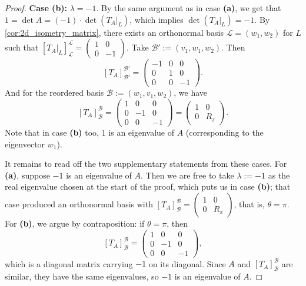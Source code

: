 \begin{proof}
\textbf{Case (b):} $\lambda = -1$. By the same argument as in case \textbf{(a)}, we get that $1 = \det A = (-1) \cdot \det(T_A|_L)$, which implies $\det(T_A|_L) = -1$. By \cref{cor:2d_isometry_matrix}, there exists an orthonormal basis $\mathcal{L} = (w_1, w_2)$ for $L$ such that $[T_A|_L]_{\mathcal{L}}^{\mathcal{L}} = \left(\begin{smallmatrix} 1 & 0 \\ 0 & -1 \end{smallmatrix}\right)$.
Take $\mathcal{B}' := (v_1, w_1, w_2)$. Then
\[ [T_A]_{\mathcal{B}'}^{\mathcal{B}'} = \begin{pmatrix} -1 & 0 & 0 \\ 0 & 1 & 0 \\ 0 & 0 & -1 \end{pmatrix}. \]
And for the reordered basis $\mathcal{B} := (w_1, v_1, w_2)$, we have 
\[ [T_A]_{\mathcal{B}}^{\mathcal{B}} = \begin{pmatrix} 1 & 0 & 0 \\ 0 & -1 & 0 \\ 0 & 0 & -1 \end{pmatrix} = \begin{pmatrix} 1 & 0 \\ 0 & R_\pi \end{pmatrix}. \]
Note that in case \textbf{(b)} too, $1$ is an eigenvalue of $A$ (corresponding to the eigenvector $w_1$).

It remains to read off the two supplementary statements from these cases. For \textbf{(a)}, suppose $-1$ is an eigenvalue of $A$. Then we are free to take $\lambda := -1$ as the real eigenvalue chosen at the start of the proof, which puts us in case \textbf{(b)}; that case produced an orthonormal basis with $[T_A]_{\mathcal{B}}^{\mathcal{B}} = \left(\begin{smallmatrix} 1 & 0 \\ 0 & R_\pi \end{smallmatrix}\right)$, that is, $\theta = \pi$. For \textbf{(b)}, we argue by contraposition: if $\theta = \pi$, then
\[ [T_A]_{\mathcal{B}}^{\mathcal{B}} = \begin{pmatrix} 1 & 0 & 0 \\ 0 & -1 & 0 \\ 0 & 0 & -1 \end{pmatrix}, \]
which is a diagonal matrix carrying $-1$ on its diagonal. Since $A$ and $[T_A]_{\mathcal{B}}^{\mathcal{B}}$ are similar, they have the same eigenvalues, so $-1$ is an eigenvalue of $A$.
\end{proof}

